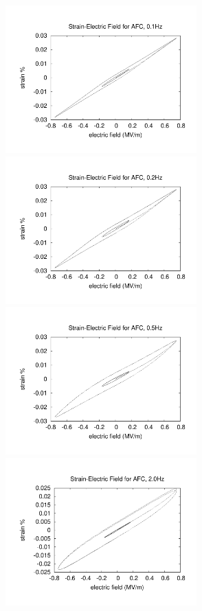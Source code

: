\begin{figure} 
\centering
{}
{\includegraphics[width=2.9in]{./chap_4_structural_analyses/afc_unit_cell/frequency_effect/electric_field_vs_strains_freq_0p1}}
{\includegraphics[width=2.9in]{./chap_4_structural_analyses/afc_unit_cell/frequency_effect/electric_field_vs_strains_freq_0p2}}
{\includegraphics[width=2.9in]{./chap_4_structural_analyses/afc_unit_cell/frequency_effect/electric_field_vs_strains_freq_0p5}}
{\includegraphics[width=2.9in]{./chap_4_structural_analyses/afc_unit_cell/frequency_effect/electric_field_vs_strains_freq_2p0}}

\end{figure}

